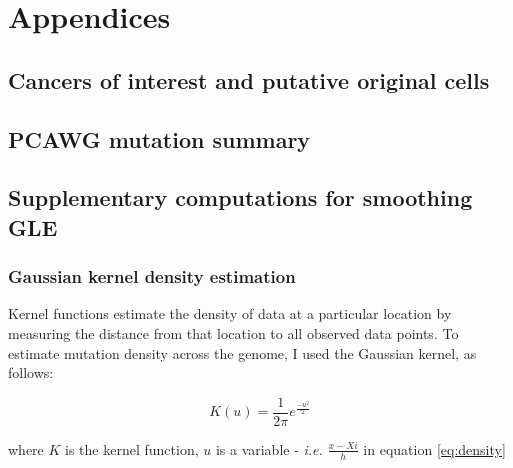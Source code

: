 \newpage
\setcounter{table}{0}
\setcounter{figure}{0}
\setcounter{section}{0}
\setcounter{equation}{0}
\renewcommand\thesection{A.\arabic{section}} 
\renewcommand\thefigure{A\arabic{figure}} 
\renewcommand\thetable{A\arabic{table}} 
\renewcommand\theequation{A\arabic{table}} 

\chapter*{Appendices}

\section{Cancers of interest and putative original cells}


\section{PCAWG mutation summary}
\vspace{1cm}

\vspace{2cm}


% 

\newpage
\section{Supplementary computations for smoothing GLE}
\subsection{Gaussian kernel density estimation}

Kernel functions estimate the density of data at a particular location by measuring the distance from that location to all observed data points. To estimate mutation density across the genome, I used the Gaussian kernel, as follows:

\begin{equation}
    K(u) = \frac{1}{2\pi} e^{\frac{-u^2}{2}}
    \label{eq:gaussian}
\end{equation}

where $K$ is the kernel function, $u$ is a variable - \textit{i.e.} $\frac{x-X{i}}{h}$ in equation \ref{eq:density}


